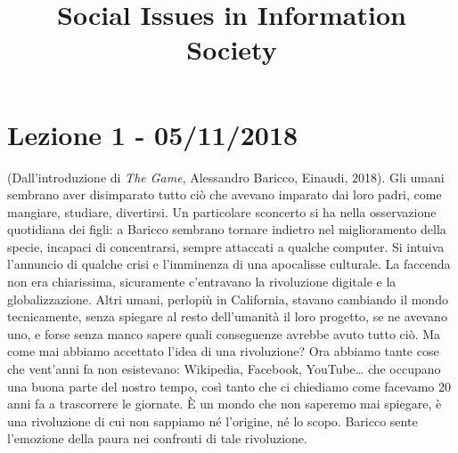 \documentclass[a4page, 11pt]{article}
\title{\textbf{Social Issues in Information Society}}
\author{}
\date{}
\begin{document}
\maketitle

\section*{Lezione 1 - 05/11/2018}
(Dall'introduzione di \textit{The Game}, Alessandro Baricco, Einaudi, 2018). \newline
Gli umani sembrano aver disimparato tutto ciò che avevano imparato dai loro padri, come mangiare, studiare, divertirsi.
Un particolare sconcerto si ha nella osservazione quotidiana dei figli: a Baricco sembrano tornare indietro nel miglioramento della specie, incapaci di concentrarsi, sempre attaccati a qualche computer.
Si intuiva l'annuncio di qualche crisi e l'imminenza di una apocalisse culturale.
La faccenda non era chiarissima, sicuramente c'entravano la rivoluzione digitale e la globalizzazione.
Altri umani, perlopiù in California, stavano cambiando il mondo tecnicamente, senza spiegare al resto dell'umanità il loro progetto, se ne avevano uno, e forse senza manco sapere quali conseguenze avrebbe avuto tutto ciò.
Ma come mai abbiamo accettato l'idea di una rivoluzione?
Ora abbiamo tante cose che vent'anni fa non esistevano: Wikipedia, Facebook, YouTube\ldots{} che occupano una buona parte del nostro tempo, così tanto che ci chiediamo come facevamo 20 anni fa a trascorrere le giornate.
È un mondo che non saperemo mai spiegare, è una rivoluzione di cui non sappiamo né l'origine, né lo scopo.
Baricco sente l'emozione della paura nei confronti di tale rivoluzione. \newline
\end{document}
